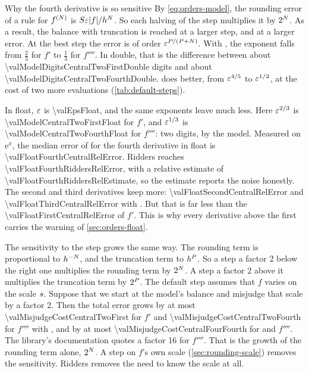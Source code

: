 \begin{sidebar}[label=sb:fourth-sensitivity]{Why the fourth derivative is so sensitive}
By \cref{eq:orders-model}, the rounding error of a rule for $f^{(N)}$ is
$S \varepsilon \lvert f \rvert / h^{N}$. So each halving of the step multiplies it by $2^{N}$. As a result, the
balance with truncation is reached at a larger step, and at a larger error. At the best step the error is of order
$\varepsilon^{P/(P + N)}$. With , the exponent falls from $\tfrac23$ for $f'$ to
$\tfrac13$ for $f''''$. In double, that is the difference between about \num{\valModelDigitsCentralTwoFirstDouble}
digits and about \num{\valModelDigitsCentralTwoFourthDouble}.  does better, from $\varepsilon^{4/5}$ to
$\varepsilon^{1/2}$, at the cost of two more evaluations (\cref{tab:default-steps}).

In float, $\varepsilon$ is \num{\valEpsFloat}, and the same exponents leave much less. Here $\varepsilon^{2/3}$ is
\num{\valModelCentralTwoFirstFloat} for $f'$, and $\varepsilon^{1/3}$ is \num{\valModelCentralTwoFourthFloat} for
$f''''$: two digits, by the model. Measured on $\mathrm{e}^x$, the median error of  for the fourth
derivative in float is \num{\valFloatFourthCentralRelError}. Ridders reaches \num{\valFloatFourthRiddersRelError},
with a relative estimate of \num{\valFloatFourthRiddersRelEstimate}, so the estimate reports the noise honestly. The
second and third derivatives keep more: \num{\valFloatSecondCentralRelError} and \num{\valFloatThirdCentralRelError}
with . But that is far less than the \num{\valFloatFirstCentralRelError} of $f'$. This is why every
derivative above the first carries the warning of \cref{sec:orders-float}.

The sensitivity to the step grows the same way. The rounding term is proportional to $h^{-N}$, and the
truncation term to $h^{P}$. So a step a factor 2 below the right one multiplies the rounding term by
$2^{N}$. A step a factor 2 above it multiplies the truncation term by $2^{P}$. The default step assumes
that $f$ varies on the scale $s$. Suppose that we start at the model's balance and misjudge that scale by a
factor 2. Then the total error grows by at most \num{\valMisjudgeCostCentralTwoFirst} for $f'$ and
\num{\valMisjudgeCostCentralTwoFourth} for $f''''$ with , and by at most
\num{\valMisjudgeCostCentralFourFourth} for  and $f''''$. The library's documentation quotes a
factor 16 for $f''''$. That is the growth of the rounding term alone, $2^{N}$. A step on $f$'s own scale
(\cref{sec:rounding-scale}) removes the sensitivity. Ridders removes the need to know the scale at all.
\end{sidebar}

